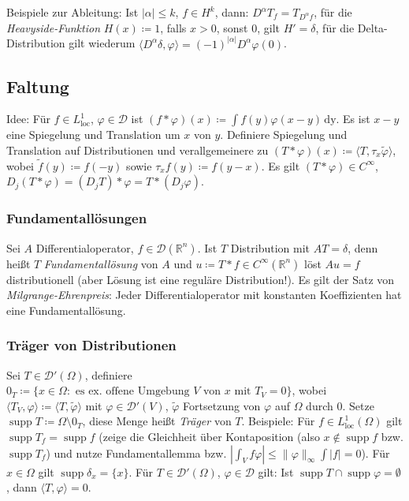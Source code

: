 \documentclass[11pt,a4paper]{scrartcl}
\newcommand{\R}{\mathbb{R}} %
\newcommand{\D}{\mathcal{D}}
\theoremstyle{plain}
\theoremstyle{definition}
\theoremstyle{remark}
\DeclareMathOperator{\supp}{supp}
\DeclareMathOperator{\loc}{loc}
\begin{document}
Beispiele zur Ableitung: Ist $|\alpha| \leq k$, $f\in H^k$, dann: $D^\alpha T_f = T_{D^\alpha f}$, für die \emph{Heavyside-Funktion} $H(x)\coloneqq 1$, falls $x>0$, sonst $0$, gilt $H'=\delta$, für die Delta-Distribution gilt wiederum $\langle D^\alpha \delta, \varphi \rangle = (-1)^{|\alpha|} D^\alpha \varphi(0)$.

\subsection{Faltung}

Idee: Für $f\in L^1_{\loc}$, $\varphi\in \D$ ist $(f*\varphi)(x)\coloneqq \int f(y)\varphi(x-y) \, \mathrm{dy}$. Es ist $x-y$ eine Spiegelung und Translation um $x$ von $y$. Definiere Spiegelung und Translation auf Distributionen und verallgemeinere zu $(T*\varphi)(x)\coloneqq \langle T, \tau_x \tilde\varphi \rangle$, wobei $\tilde f(y) \coloneqq f(-y)$ sowie $\tau_x f(y) \coloneqq f(y-x)$. Es gilt $(T*\varphi)\in C^\infty$, $D_j (T*\varphi) = (D_j T)*\varphi = T*(D_j \varphi)$.

\subsubsection{Fundamentallösungen}

Sei $A$ Differentialoperator, $f\in \D(\R^n)$. Ist $T$ Distribution mit $AT=\delta$, denn heißt $T$ \emph{Fundamentallösung} von $A$ und $u\coloneqq T*f \in C^\infty(\R^n)$ löst $Au=f$ distributionell (aber Lösung ist eine reguläre Distribution!). Es gilt der Satz von \emph{Milgrange-Ehrenpreis}: Jeder Differentialoperator mit konstanten Koeffizienten hat eine Fundamentallösung.

\subsubsection{Träger von Distributionen}

Sei $T\in \D'(\Omega)$, definiere $0_T\coloneqq \{ x\in\Omega: \text{ es ex. offene Umgebung } V \text{ von } x \text{ mit } T_V = 0 \}$, wobei $\langle T_V, \varphi \rangle \coloneqq \langle T, \tilde\varphi \rangle$ mit $\varphi\in \D'(V)$, $\tilde\varphi$ Fortsetzung von $\varphi$ auf $\Omega$ durch $0$. Setze $\supp T\coloneqq \Omega \setminus 0_T$, diese Menge heißt \emph{Träger} von $T$. Beispiele: Für $f\in L^1_{\loc}(\Omega)$ gilt $\supp T_f = \supp f$ (zeige die Gleichheit über Kontaposition (also $x\not \in \supp f$ bzw. $\supp T_f$) und nutze Fundamentallemma bzw. $|\int_V f\varphi|\leq \|\varphi\|_\infty \int |f| = 0$). Für $x\in\Omega$ gilt $\supp \delta_x = \{ x \}$. Für $T\in \D'(\Omega)$, $\varphi \in \D$ gilt: Ist $\supp T \cap \supp \varphi = \emptyset$, dann $\langle T, \varphi \rangle = 0$.
\end{document}
